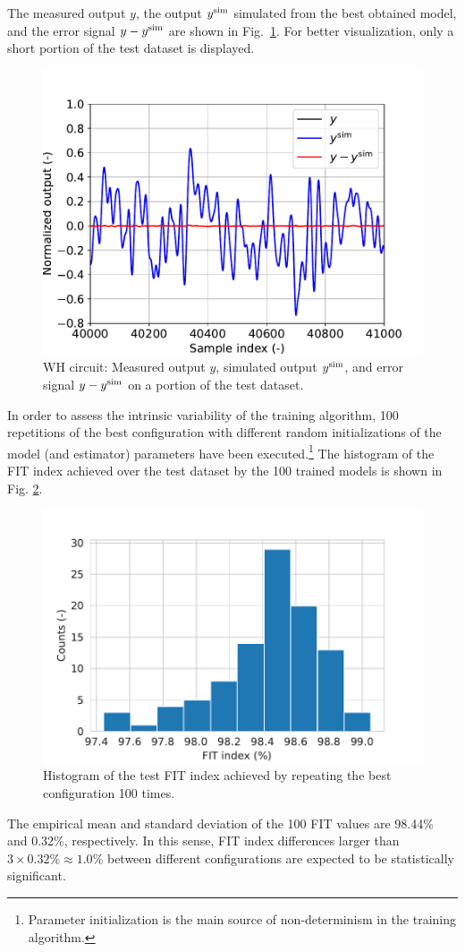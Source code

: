 \documentclass{article}
\begin{document}
The measured output $y$, the output $y^{\rm sim}$ simulated from the best obtained model, and the error signal $y - y^{\rm sim}$ are shown in Fig.~\ref{fig:wh_best_timetrace.pdf}. For better visualization, only a short portion of the test dataset is displayed.
\begin{figure}
    \centering
    \includegraphics[width=.6\linewidth]{figures/wh_best_timetrace.pdf}
    \caption{WH circuit: Measured output $y$, simulated output $y^{\rm sim}$, and error signal $y - y^{\rm sim}$ on a portion of the test dataset.}
    \label{fig:wh_best_timetrace.pdf}
\end{figure}

In order to assess the intrinsic variability of the training algorithm, 100 repetitions of the best configuration with different random initializations of the model (and estimator) parameters have been executed.\footnote{Parameter initialization is the main source of non-determinism in the training algorithm.} The histogram of the FIT index achieved over the test dataset by the 100 trained models is shown in Fig. \ref{fig:wh_best_hist}.
\begin{figure}
    \centering
    \includegraphics[width=.6\linewidth]{figures/wh_best_hist.pdf}
    \caption{Histogram of the test FIT index achieved by repeating the best configuration 100 times.}
    \label{fig:wh_best_hist}
\end{figure}
The empirical mean and standard deviation of the 100 FIT values are 98.44\% and 0.32\%, respectively.
In this sense, FIT index differences larger than $3 \times 0.32\% \approx 1.0\%$ between different configurations are expected to be statistically significant.
\end{document}
